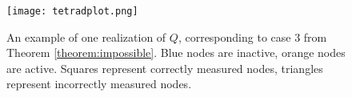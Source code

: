 \documentclass[a4paper]{article}
\begin{document}
\begin{figure}[h]
\label{fig:tetradplot}
\texttt{[image: tetradplot.png]}
\caption{An example of one realization of $Q$, corresponding to case 3 from Theorem \ref{theorem:impossible}. Blue nodes are inactive, orange nodes are active. Squares represent correctly measured nodes, triangles represent incorrectly measured nodes.}
\end{figure}

\begin{comment}
\begin{table} \label{table:processes}
 \begin{center}
  \begin{tabular}{cccc|c}
    Information & Update Process & Activation Delay & Fast Updating & Measurable \\
    \hline
    Public & Async & Yes & Yes & No \\
    Public & Async & Yes & No & No \\
    Public & Async & No & -- & No \\
    Public & Async & No & No & No \\
    Public & Sync & Yes & Yes & No \\
    Public & Sync & Yes & No & No \\
    Public & Sync & No & -- & No \\
    Public & Sync & No & No & No \\
    \rowcolor{lightgray} Private & Async & Yes & Yes & Yes \\
    Private & Async & Yes & No & No \\
    Private & Async & No & -- & No \\
    Private & Async & No & No & No \\
    \rowcolor{lightgray} Private & Sync & Yes & Yes & Yes \\
    Private & Sync & Yes & No & No \\
    Private & Sync & No & -- & No \\
    Private & Sync & No & No & No \\
  \end{tabular}
 \end{center}
  \caption{Exhaustive list of the 8 possible contagion processes. Only certain private information processes with an activation delay are threshold measurable. Gray indicates measurable.}
\end{table}
\end{comment}
\end{document}
